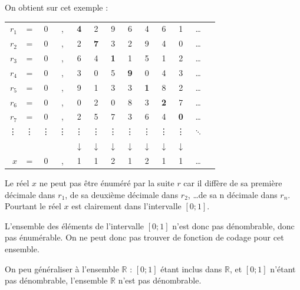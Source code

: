 On obtient sur cet exemple :

\begin{tabular}{r c c c c c c c c c c c c}
$r_1$ & = &0&,&\textbf{4}&2&9&6&4&6&1 &\ldots\\
$r_2$ & = &0&,&2&\textbf{7}&3&2&9&4&0 &\ldots\\
$r_3$ & = &0&,&6&4&\textbf{1}&1&5&1&2 &\ldots\\
$r_4$ & = &0&,&3&0&5&\textbf{9}&0&4&3 &\ldots\\
$r_5$ & = &0&,&9&1&3&3&\textbf{1}&8&2 &\ldots\\
$r_6$ & = &0&,&0&2&0&8&3&\textbf{2}&7 &\ldots\\
$r_7$ & = &0&,&2&5&7&3&6&4&\textbf{0} &\ldots\\
\vdots & \vdots & \vdots & \vdots & \vdots & \vdots & \vdots & \vdots & \vdots & \vdots & \vdots & $\ddots$ \\
&&&&$\downarrow$ &$\downarrow$ &$\downarrow$ &$\downarrow$ &$\downarrow$ &$\downarrow$ &$\downarrow$ &\\
$x$ & = &0&,&1&1&2&1&2&1&1&\ldots\\
\end{tabular}

Le réel $x$ ne peut pas être énuméré par la suite $r$ car il diffère de sa première décimale dans $r_1$, de sa deuxième décimale dans $r_2$, \ldots de sa n décimale dans $r_n$. Pourtant le réel $x$ est clairement dans l'intervalle $[0;1]$.

L'ensemble des éléments de l'intervalle $[0;1]$ n'est donc pas dénombrable, donc pas énumérable. On ne peut donc pas trouver de fonction de codage pour cet ensemble.

On peu généraliser à l'ensemble $\mathbb{R}$ : $[0;1]$ étant inclus dans $\mathbb{R}$, et $[0;1]$ n'étant pas dénombrable, l'ensemble $\mathbb{R}$ n'est pas dénombrable.